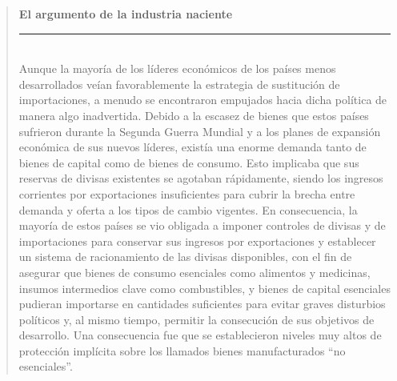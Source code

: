 \documentclass[10pt,a4paper]{article}
\newenvironment{specialblock}[1]{%
      \begin{quote} %
      \small %
      \noindent\textbf{#1}\\[-0.3em] %
      \rule{\linewidth}{0.4pt}\\[0.6em]}{
      \end{quote}}
\begin{document}
\begin{specialblock}{El argumento de la industria naciente}
    Aunque la mayoría de los líderes económicos de los países menos desarrollados veían favorablemente la estrategia de sustitución de importaciones, a menudo se encontraron empujados hacia dicha política de manera algo inadvertida. Debido a la escasez de bienes que estos países sufrieron durante la Segunda Guerra Mundial y a los planes de expansión económica de sus nuevos líderes, existía una enorme demanda tanto de bienes de capital como de bienes de consumo. Esto implicaba que sus reservas de divisas existentes se agotaban rápidamente, siendo los ingresos corrientes por exportaciones insuficientes para cubrir la brecha entre demanda y oferta a los tipos de cambio vigentes. En consecuencia, la mayoría de estos países se vio obligada a imponer controles de divisas y de importaciones para conservar sus ingresos por exportaciones y establecer un sistema de racionamiento de las divisas disponibles, con el fin de asegurar que bienes de consumo esenciales como alimentos y medicinas, insumos intermedios clave como combustibles, y bienes de capital esenciales pudieran importarse en cantidades suficientes para evitar graves disturbios políticos y, al mismo tiempo, permitir la consecución de sus objetivos de desarrollo. Una consecuencia fue que se establecieron niveles muy altos de protección implícita sobre los llamados bienes manufacturados “no esenciales”.
\end{specialblock}
\end{document}
